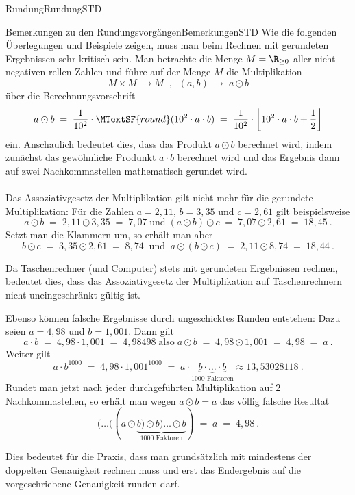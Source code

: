 \begin{MXContent}{Rundung}{Rundung}{STD}
\end{MXContent}

\begin{MXContent}{Bemerkungen zu den Rundungsvorgängen}{Bemerkungen}{STD}
Wie die folgenden Überlegungen und Beispiele zeigen, muss man beim Rechnen mit gerundeten Ergebnissen sehr kritisch sein.
Man betrachte die Menge $M=\R_{\geq0}$ aller nicht negativen rellen Zahlen und führe auf der Menge $M$ die Multiplikation
$$
M\times M \;\longrightarrow M\;\; , \;\;
(a,b)\;\longmapsto\; a\odot b
$$
über die Berechnungsvorschrift
$$
a\odot b \; =\; \frac{1}{10^{2}}\cdot \MTextSF{round}( 10^{2}\cdot a \cdot b)\; =\; \frac{1}{10^{2}}\cdot \left\lfloor{ 10^{2}\cdot a \cdot b + \frac{1}{2} }\right\rfloor
$$
ein. Anschaulich bedeutet dies, dass das Produkt $a\odot b$ berechnet wird, indem zunächst das gewöhnliche Produnkt $a\cdot b$ berechnet wird und
das Ergebnis dann auf zwei Nachkommastellen mathematisch gerundet wird.
\ \\ \ \\
Das Assoziativgesetz der Multiplikation gilt nicht mehr für die gerundete Multiplikation:
Für die Zahlen $a=2,11$, $b=3,35$ und $c=2,61$ gilt beispielsweise
$$
a\odot b \;=\; 2,11 \odot 3,35 \; =\; 7,07\;\text{und}\;
(a\odot b)\odot c \; =\; 7,07 \odot 2,61 \;=\;  18,45\: .
$$
Setzt man die Klammern um, so erhält man aber
$$
b\odot c\;  =\; 3,35 \odot 2,61 \; =\; 8,74\;\;\text{und}\;\;a\odot (b\odot c)\; =\;2,11 \odot 8,74 \;=\; 18,44\: .
$$

\begin{MInfo}
Da Taschenrechner (und Computer) stets mit gerundeten Ergebnissen rechnen, bedeutet dies, dass das Assoziativgesetz der Multiplikation auf Taschenrechnern nicht uneingeschränkt gültig ist.
\end{MInfo}

Ebenso können falsche Ergebnisse durch ungeschicktes Runden entstehen:
Dazu seien $a=4,98$ und $b=1,001$. Dann gilt
$$
a\cdot b\; =\; 4,98 \cdot 1,001\; =\; 4,98498\;\text{also}\;
a\odot b \; =\; 4,98 \odot 1,001\; =\; 4,98\; =\; a\: .
$$
Weiter gilt
$$
a\cdot b^{1000}\; =\; 4,98 \cdot 1,001^{1000} \;=\; a\cdot \underbrace{b\cdot \ldots \cdot b}_{1000 \text{ Faktoren}} \approx 13,53028118\: .
$$
Rundet man jetzt nach jeder durchgeführten Multiplikation auf $2$ Nachkommastellen, so erhält man wegen $a\odot b=a$ das völlig falsche Resultat
$$
(\ldots ((a\odot \underbrace{b) \odot b) \ldots \odot b}_{1000 \text{ Faktoren}}) \;=\;  a\; =\;4,98 \: .
$$

\begin{MInfo}
Dies bedeutet für die Praxis, dass man grundsätzlich mit mindestens der doppelten Genauigkeit rechnen muss und erst das Endergebnis auf die vorgeschriebene Genauigkeit runden darf.
\end{MInfo}

\end{MXContent}

